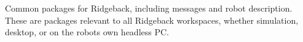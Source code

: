 Common packages for Ridgeback, including messages and robot description. These are packages relevant to all Ridgeback workspaces, whether simulation, desktop, or on the robot\textquotesingle{}s own headless PC. 